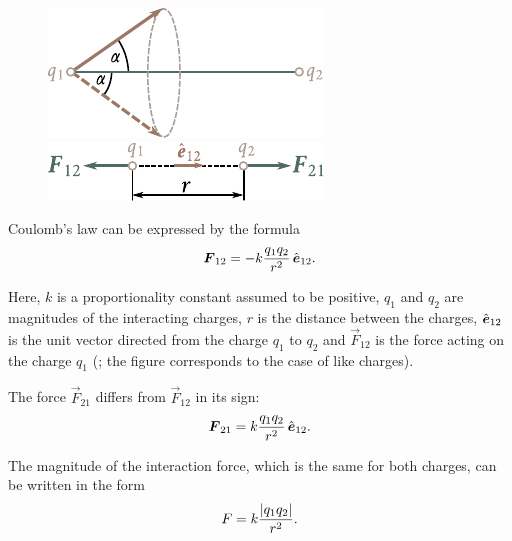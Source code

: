 \begin{figure}[t]
	\begin{minipage}[t]{0.5\linewidth}
		\begin{center}
			\includegraphics[scale=1]{figures/ch_01/fig_1_2.pdf}
			\caption[]{}
			\label{fig:1_2}
		\end{center}
	\end{minipage}
	\hspace{-0.05cm}
	\begin{minipage}[t]{0.5\linewidth}
		\begin{center}
			\includegraphics[scale=1]{figures/ch_01/fig_1_3.pdf}
			\caption[]{}
			\label{fig:1_3}
		\end{center}
	\end{minipage}
\vspace{-0.4cm}
\end{figure}

Coulomb's law can be expressed by the formula
\begin{equation}\label{eq:1_2}
	\boldsymbol{F}_{12} = -k \frac{q_1 q_2}{r^2}\,\hat{\boldsymbol{e}}_{12}.
\end{equation}

\noindent
Here, $k$ is a proportionality constant assumed to be positive, $q_1$ and $q_2$ are magnitudes of the interacting charges, $r$ is the distance between the charges, $\hat{\boldsymbol{e}}_{12}$ is the unit vector directed from the charge $q_1$ to $q_2$ and $\vec{F}_{12}$ is the force acting on the charge $q_1$ (; the figure corresponds to the case of like charges).

The force $\vec{F}_{21}$ differs from $\vec{F}_{12}$ in its sign:
\begin{equation}\label{eq:1_3}
	\boldsymbol{F}_{21} = k \frac{q_1 q_2}{r^2}\,\hat{\boldsymbol{e}}_{12}.
\end{equation}

The magnitude of the interaction force, which is the same for both charges, can be written in the form
\begin{equation}\label{eq:1_4}
	F = k \frac{\left| q_1 q_2 \right|}{r^2}.
\end{equation}

